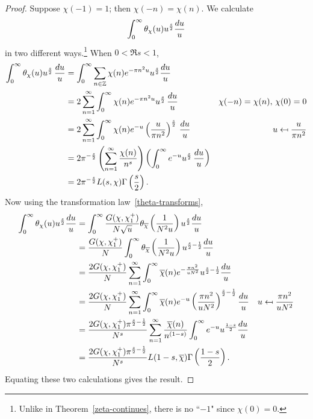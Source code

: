 \begin{proof}
 Suppose $\chi(-1)=1$; then $\chi(-n)=\chi(n)$. We calculate
\[
\int_0^{\infty} \theta_{\chi}(u) u^{\frac s2}\frac{du}{u}
\]
in two different ways.\footnote{Unlike in Theorem~\ref{zeta-continues}, there is no ``$-1$" since $\chi(0)=0$.} When $0<\Re s<1$,
\begin{align*}
\int_0^{\infty} \theta_{\chi}(u)u^{\frac s2} \,\frac{du}u
&=\int_0^{\infty} \sum_{n\in\mathbb{Z}} \chi(n) e^{-\pi n^2u}u^{\frac s2}\frac{du}u\\
&=2\sum_{n=1}^{\infty} \int_0^{\infty} \chi(n) e^{-\pi n^2u}u^{\frac{s}2}\,\frac{du}u&\chi(-n)=\chi(n),\,\chi(0)=0\\
&=2\sum_{n=1}^{\infty} \int_0^{\infty} \chi(n)e^{-u} \left( {\frac{u}{\pi n^2}} \right)^{\frac s2}\,\frac{du}u&u\mapsfrom \frac{u}{\pi n^2}\\
&=2\pi^{-\frac s2}\left( {\sum_{n=1}^{\infty} \frac{\chi(n)}{n^s}} \right)\left( {\int_0^{\infty} e^{-u} u^{\frac s2}\,\frac{du}u} \right)\\
&=2\pi^{-\frac s2} L(s,\chi)\Gamma\left( {\frac{s}{2}} \right).
\end{align*}
Now using the transformation law~\ref{theta-transforms},
\begin{align*}
\int_0^{\infty} \theta_{\chi}(u) u^{\frac s2}\frac{du}{u}
&=\int_0^{\infty} \frac{G(\chi,\chi^+_1)}{N\sqrt u} \theta_{\overline{\chi}} \left( {\frac{1}{N^2u}} \right) u^{\frac s2}\frac{du}u\\
&=\frac{G(\chi,\chi^+_1)}N \int_0^{\infty} \theta_{\overline{\chi}} \left( {\frac{1}{N^2u}} \right) u^{\frac s2-\frac{1}{2}}\frac{du}u\\
&=\frac{2G(\chi,\chi^+_1)}N \sum_{n=1}^{\infty}\int_0^{\infty} \overline{\chi}(n) e^{-\frac{\pi n^2}{uN^2}} u^{\frac s2-\frac{1}{2}}\frac{du}u\\
&=\frac{2G(\chi,\chi^+_1)}N \sum_{n=1}^{\infty}\int_0^{\infty} \overline{\chi}(n) e^{-u} \left( {\frac{\pi n^2}{uN^2}} \right)^{\frac s2-\frac{1}{2}}\frac{du}u&u\mapsfrom \frac{\pi n^2}{uN^2}\\
&=\frac{2G(\chi,\chi^+_1)\pi^{\frac s2-\frac{1}{2}}}{N^s} \sum_{n=1}^{\infty} \frac{\overline{\chi}(n)}{n^{(1-s)}}\int_0^{\infty}e^{-u} u^{\frac{1-s}{2}}\frac{du}{u}\\
&=\frac{2G(\chi,\chi^+_1)\pi^{\frac s2-\frac{1}{2}}}{N^s} L(1-s,\overline{\chi}) \Gamma\left( {\frac{1-s}{2}} \right).
\end{align*}
Equating these two calculations gives the result.


\end{proof}
